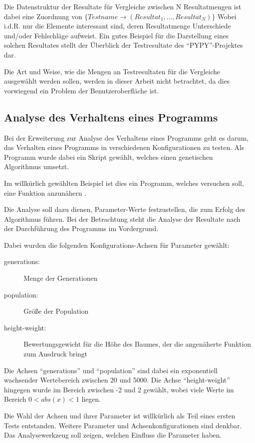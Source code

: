 Die Datenstruktur der Resultate für Vergleiche zwischen N Resultatmengen
ist dabei eine Zuordnung von
$\{ Testname \rightarrow ( Resultat_{1},\ldots,Resultat_{N})\}$
Wobei i.d.R. nur die Elemente interessant sind,
deren Resultatmenge Unterschiede und/oder Fehlschläge aufweist.
Ein gutes Beispiel für die Darstellung eines solchen Resultates
stellt der Überblick der Testresultate des ``PYPY''-Projektes \cite{pypy:overview} dar.

Die Art und Weise, wie die Mengen an Testresultaten für die Vergleiche ausgewählt werden sollen, werden in dieser Arbeit nicht betrachtet,
da dies vorwiegend ein Problem der Benutzeroberfläche ist.

\subsection{Analyse des Verhaltens eines Programms}

Bei der Erweiterung zur Analyse des Verhaltens eines Programms
geht es darum, das Verhalten eines Programms
in verschiedenen Konfigurationen zu testen.
Als Programm wurde dabei ein Skript gewählt,
welches einen genetischen Algorithmus umsetzt.

Im willkürlich gewählten Beispiel ist dies ein Programm,
welches versuchen soll, eine Funktion anzunähern \cite{gen:prog}.

Die Analyse soll dazu dienen, Parameter-Werte festzustellen,
die zum Erfolg des Algorithmus führen.
Bei der Betrachtung steht die Analyse der Resultate nach der Durchführung des Programms im Vordergrund.

Dabei wurden die folgenden Konfigurations-Achsen für Parameter gewählt:

\begin{description}
    \item[generations:] Menge der Generationen
    \item[population:] Größe der Population
    \item[height-weight:] Bewertungsgewicht für die Höhe des Baumes, der die angenäherte Funktion zum Ausdruck bringt
\end{description}

Die Achsen ``generations'' und ``population'' sind dabei ein exponentiell wachsender Wertebereich zwischen 20 und 5000.
Die Achse ``height-weight'' hingegen wurde im Bereich zwischen -2 und 2 gewählt,
wobei viele Werte im Bereich $ 0<abs(x)<1$ liegen.

Die Wahl der Achsen und ihrer Parameter ist willkürlich als Teil eines ersten Tests entstanden.
Weitere Parameter und Achsenkonfigurationen sind denkbar.
Das Analysewerkzeug soll zeigen, welchen Einfluss die Parameter haben.

